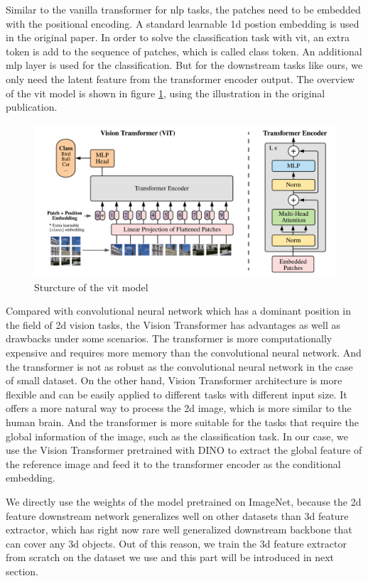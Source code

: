 \documentclass[12pt,DIV14,BCOR12mm,a4paper,footinclude=false,headinclude,parskip=half-,twoside,openright,cleardoublepage=empty,toc=index,bibliography=totoc,listof=totoc]{scrreprt}
\numberwithin{equation}{chapter}
\begin{document}
Similar to the vanilla transformer for \gls{nlp} tasks, the patches need to be embedded with the positional encoding. A standard learnable \gls{1d} postion embedding is used in the original paper. In order to solve the classification task with \gls{vit}, an extra token is add to the sequence of patches, which is called class token. An additional \gls{mlp} layer is used for the classification. But for the downstream tasks like ours, we only need the latent feature from the transformer encoder output. The overview of the \gls{vit} model is shown in figure \ref{img:vit}, using the illustration in the original publication.
\begin{figure}[h]
	\centering
	\includegraphics[scale=.23]{img/vit.png}
	\caption{Sturcture of the \gls{vit} model}
	\label{img:vit}
\end{figure}

Compared with convolutional neural network which has a dominant position in the field of \gls{2d} vision tasks, the Vision Transformer has advantages as well as drawbacks under some scenarios. The transformer is more computationally expensive and requires more memory than the convolutional neural network. And the transformer is not as robust as the convolutional neural network in the case of small dataset. On the other hand, Vision Transformer architecture is more flexible and can be easily applied to different tasks with different input size. It offers a more natural way to process the \gls{2d} image, which is more similar to the human brain. And the transformer is more suitable for the tasks that require the global information of the image, such as the classification task. In our case, we use the Vision Transformer pretrained with DINO to extract the global feature of the reference image and feed it to the transformer encoder as the conditional embedding.

We directly use the weights of the model pretrained on ImageNet\cite{5206848}, because the \gls{2d} feature downstream network generalizes well on other datasets than \gls{3d} feature extractor, which has right now rare well generalized downstream backbone that can cover any \gls{3d} objects. Out of this reason, we train the \gls{3d} feature extractor from scratch on the dataset we use and this part will be introduced in next section.
\end{document}
